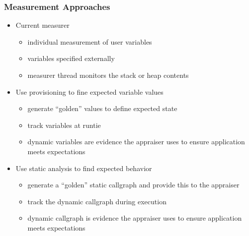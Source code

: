 \documentclass{beamer}
\begin{document}
\begin{frame}
  \frametitle{Measurement Approaches}
  \begin{itemize}
  \item Current measurer
    \begin{itemize}
    \item individual measurement of user variables
    \item variables specified externally
    \item measurer thread monitors the stack or heap contents
    \end{itemize}
  \item Use provisioning to fine expected variable values
    \begin{itemize}
    \item generate ``golden'' values to define expected state
    \item track variables at runtie
    \item dynamic variables are evidence the appraiser uses to ensure
      application meets expectations
    \end{itemize}
  \item Use static analysis to find expected behavior
    \begin{itemize}
    \item generate a ``golden'' static callgraph and provide this to the
      appraiser
    \item track the dynamic callgraph during execution
    \item dynamic callgraph is evidence the appraiser uses to ensure
      application meets expectations
    \end{itemize}   
  \end{itemize}
\end{frame}
\end{document}
